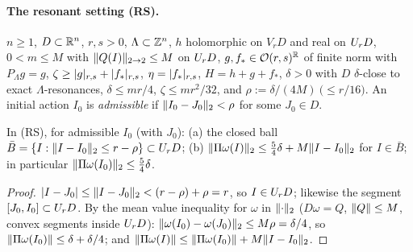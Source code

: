 \paragraph{The resonant setting (RS).} $n\ge1$, $D\subset\mathbb{R}^n$, $r,s>0$, $\Lambda\subset\mathbb{Z}^n$, $h$ holomorphic on $V_rD$ and real on $U_{r}D$, $0<m\le M$ with $\lVert Q(I)\rVert_{2\to2}\le M$ on $U_{r}D$, $g,f_*\in\mathcal O(r,s)^{\mathbb{R}}$ of finite norm with $P_\Lambda g=g$, $\zeta\ge\lvert g\rvert_{r,s}+\lvert f_*\rvert_{r,s}$, $\eta=\lvert f_*\rvert_{r,s}$, $H=h+g+f_*$, $\delta>0$ with $D$ $\delta$-close to exact $\Lambda$-resonances, $\delta\le mr/4$, $\zeta\le mr^2/32$, and $\rho:=\delta/(4M)\ \bigl(\le r/16\bigr)$.
An initial action $I_0$ is \emph{admissible} if $\lVert I_0-J_0\rVert_2<\rho$ for some $J_0\in D$.

\begin{lemma}\label{bpN:p7:admissible}
In (RS), for admissible $I_0$ (with $J_0$): (a) the closed ball $\bar B=\{I:\lVert I-I_0\rVert_2\le r-\rho\}\subset U_{r}D$; (b) $\lVert \Pi\omega(I)\rVert_2\le\frac54\delta+M\lVert I-I_0\rVert_2$ for $I\in\bar B$; in particular $\lVert \Pi\omega(I_0)\rVert_2\le\frac54\delta$.
\end{lemma}
\begin{proof}
\label{stepN:p7:ad-ball} $\lvert I-J_0\rvert\le\lVert I-J_0\rVert_2<(r-\rho)+\rho=r$, so $I\in U_{r}D$; likewise the segment $[J_0,I_0]\subset U_{r}D$.
\label{stepN:p7:ad-close} By the mean value inequality for $\omega$ in $\lVert \cdot\rVert_2$ ($D\omega=Q$, $\lVert Q\rVert\le M$, convex segments inside $U_{r}D$): $\lVert \omega(I_0)-\omega(J_0)\rVert_2\le M\rho=\delta/4$, so $\lVert \Pi\omega(I_0)\rVert\le\delta+\delta/4$; and $\lVert \Pi\omega(I)\rVert\le\lVert \Pi\omega(I_0)\rVert+M\lVert I-I_0\rVert_2$.
\end{proof}

